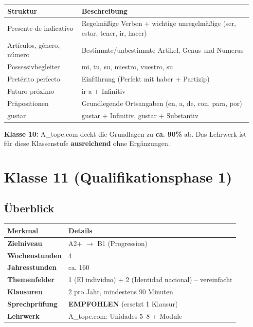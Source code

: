 \documentclass[10pt,a4paper]{article}
\begin{document}
\begin{center}
\begin{tabular}{|l|p{9cm}|}
\hline
\rowcolor{lightgray}
\textbf{Struktur} & \textbf{Beschreibung} \\
\hline
Presente de indicativo & Regelmäßige Verben + wichtige unregelmäßige (ser, estar, tener, ir, hacer) \\
\hline
Artículos, género, número & Bestimmte/unbestimmte Artikel, Genus und Numerus \\
\hline
Possessivbegleiter & mi, tu, su, nuestro, vuestro, su \\
\hline
Pretérito perfecto & Einführung (Perfekt mit haber + Partizip) \\
\hline
Futuro próximo & ir a + Infinitiv \\
\hline
Präpositionen & Grundlegende Ortsangaben (en, a, de, con, para, por) \\
\hline
gustar & gustar + Infinitiv, gustar + Substantiv \\
\hline
\end{tabular}
\end{center}

\begin{empfehlungbox}
\textbf{Klasse 10:} A\_tope.com deckt die Grundlagen zu \textbf{ca. 90\%} ab. Das Lehrwerk ist für diese Klassenstufe \textbf{ausreichend} ohne Ergänzungen.
\end{empfehlungbox}

\newpage

\section{Klasse 11 (Qualifikationsphase 1)}

\subsection{Überblick}

\begin{center}
\begin{tabular}{|p{4cm}|p{9.5cm}|}
\hline
\rowcolor{spaet}\color{white}\textbf{Merkmal} & \color{white}\textbf{Details} \\
\hline
\textbf{Zielniveau} & A2+ $\rightarrow$ B1 (Progression) \\
\hline
\textbf{Wochenstunden} & 4 \\
\hline
\textbf{Jahresstunden} & ca. 160 \\
\hline
\textbf{Themenfelder} & 1 (El individuo) + 2 (Identidad nacional) -- vereinfacht \\
\hline
\textbf{Klausuren} & 2 pro Jahr, mindestens 90 Minuten \\
\hline
\textbf{Sprechprüfung} & \textbf{EMPFOHLEN} (ersetzt 1 Klausur) \\
\hline
\textbf{Lehrwerk} & A\_tope.com: Unidades 5--8 + Module \\
\hline
\end{tabular}
\end{center}
\end{document}
